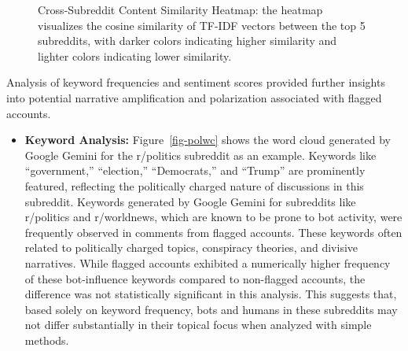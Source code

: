 \documentclass[
  12pt,
  letterpaper,
  DIV=11,
  numbers=noendperiod,
  abstract]{scrartcl}
\providecommand{\tightlist}{%
  \setlength{\itemsep}{0pt}\setlength{\parskip}{0pt}}\usepackage{longtable,booktabs,array}
\begin{document}
\begin{figure}


\caption{\label{fig-cross}Cross-Subreddit Content Similarity Heatmap:
the heatmap visualizes the cosine similarity of TF-IDF vectors between
the top 5 subreddits, with darker colors indicating higher similarity
and lighter colors indicating lower similarity.}

\end{figure}%

Analysis of keyword frequencies and sentiment scores provided further
insights into potential narrative amplification and polarization
associated with flagged accounts.

\begin{itemize}
\tightlist
\item
  \textbf{Keyword Analysis:} Figure~\ref{fig-polwc} shows the word cloud
  generated by Google Gemini for the r/politics subreddit as an example.
  Keywords like ``government,'' ``election,'' ``Democrats,'' and
  ``Trump'' are prominently featured, reflecting the politically charged
  nature of discussions in this subreddit. Keywords generated by Google
  Gemini for subreddits like r/politics and r/worldnews, which are known
  to be prone to bot activity, were frequently observed in comments from
  flagged accounts. These keywords often related to politically charged
  topics, conspiracy theories, and divisive narratives. While flagged
  accounts exhibited a numerically higher frequency of these
  bot-influence keywords compared to non-flagged accounts, the
  difference was not statistically significant in this analysis. This
  suggests that, based solely on keyword frequency, bots and humans in
  these subreddits may not differ substantially in their topical focus
  when analyzed with simple methods.
\end{itemize}
\end{document}
